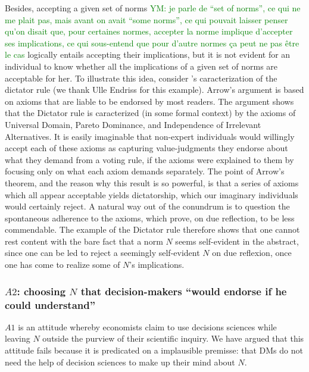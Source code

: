 \documentclass[preprint, french, english, 11pt, authoryear]{elsarticle}%
\newcommand{\protectforpdf}[1]{\texorpdfstring{\ensuremath{#1}}{#1}}
\newcommand{\commentYM}[1]{\textcolor{green}{YM: #1}}
\begin{document}
Besides, accepting a given set of norms \commentYM{je parle de ``set of norms'', ce qui ne me plait pas, mais avant on avait ``some norms'', ce qui pouvait laisser penser qu'on disait que, pour certaines normes, accepter la norme implique d'accepter ses implications, ce qui sous-entend que pour d'autre normes ça peut ne pas être le cas} logically entails accepting their implications, but it is not evident for an individual to know whether all the implications of a given set of norms are acceptable for her. To illustrate this idea, consider \citeauthor{arrow_social_2012}’s \citeyearpar{arrow_social_2012} caracterization of the dictator rule (we thank Ulle Endriss for this example). Arrow's argument is based on axioms that are liable to be endorsed by most readers. The argument shows that the Dictator rule is caracterized (in some formal context) by the axioms of Universal Domain, Pareto Dominance, and Independence of Irrelevant Alternatives. It is easily imaginable that non-expert individuals would willingly accept each of these axioms as capturing value-judgments they endorse about what they demand from a voting rule, if the axioms were explained to them by focusing only on what each axiom demands separately. The point of Arrow's theorem, and the reason why this result is so powerful, is that a series of axioms which all appear acceptable yields dictatorship, which our imaginary individuals would certainly reject. A natural way out of the conundrum is to question the spontaneous adherence to the axioms, which prove, on due reflection, to be less commendable. The example of the Dictator rule therefore shows that one cannot rest content with the bare fact that a norm $N$ seems self-evident in the abstract, since one can be led to reject a seemingly self-evident $N$ on due reflexion, once one has come to realize some of $N$'s implications.

\subsubsection{\protectforpdf{A2}: choosing \protectforpdf{N} that decision-makers “would endorse if he could understand”}
$A1$ is an attitude whereby economists claim to use decisions sciences while leaving $N$ outside the purview of their scientific inquiry. We have argued that this attitude fails because it is predicated on a implausible premisse: that \acp{DM} do not need the help of decision sciences to make up their mind about $N$. 
\end{document}
